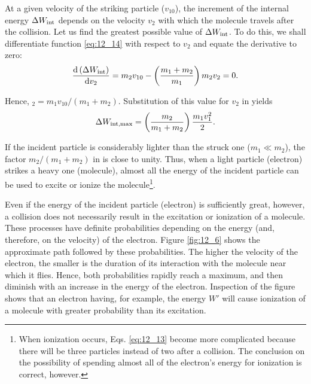 At a given velocity of the striking particle ($v_{10}$), the increment of the internal energy $\Delta{W_{\text{int}}}$ depends on the velocity $v_2$ with which the molecule travels after the collision.
Let us find the greatest possible value of $\Delta{W_{\text{int}}}$.
To do this, we shall differentiate function \eqref{eq:12_14} with respect to $v_2$ and equate the derivative to zero:
\begin{equation*}
    \dfrac{\mathrm{d}\left(\Delta{W_{\text{int}}}\right)}{\mathrm{d} v_2} = m_2 v_{10} - \left(\frac{m_1 + m_2}{m_1}\right) m_2v_2 = 0.
\end{equation*}

\noindent
Hence, $_2 = m_1v_{10}/(m_1+m_2)$.
Substitution of this value for $v_2$ in  yields
\begin{equation}\label{eq:12_15}
    \Delta{W_{\text{int,max}}} = \left(\frac{m_2}{m_1+m_2}\right) \frac{m_1v_1^2}{2}.
\end{equation}

If the incident particle is considerably lighter than the struck one ($m_1\ll m_2$), the factor $m_2/(m_1+m_2)$ in  is close to unity.
Thus, when a light particle (electron) strikes a heavy one (molecule), almost all the energy of the incident particle can be used to excite or ionize the molecule\footnote{When ionization occurs, Eqs. \eqref{eq:12_13} become more complicated because there will be three particles instead of two after a collision. The conclusion on the possibility of spending almost all of the electron's energy for ionization is correct, however.}.

Even if the energy of the incident particle (electron) is sufficiently great, however, a collision does not necessarily result in the excitation or ionization of a molecule.
These processes have definite probabilities depending on the energy (and, therefore, on the velocity) of the electron.
Figure \ref{fig:12_6} shows the approximate path followed by these probabilities.
The higher the velocity of the electron, the smaller is the duration of its interaction with the molecule near which it flies.
Hence, both probabilities rapidly reach a maximum, and then diminish with an increase in the energy of the electron.
Inspection of the figure shows that an electron having, for example, the energy $W'$ will cause ionization of a molecule with greater probability than its excitation.

